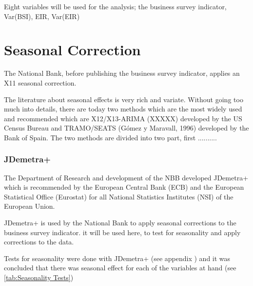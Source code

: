\documentclass[12pt,a4paper,oneside]{book}
\begin{document}
Eight variables will be used for the analysis; the business survey indicator, Var(BSI), EIR, Var(EIR)

\section{Seasonal Correction}
\label{sec:seasonal correction}

The National Bank, before publishing the business survey indicator, applies an X11 seasonal correction.

The literature about seasonal effects is very rich and variate. Without going too much into details, there are today two methods which are the most widely used and recommended which are X12/X13-ARIMA (XXXXX) developed by the US Census Bureau and TRAMO/SEATS (Gómez y Maravall, 1996) developed by the Bank of Spain. The two methods are divided into two part, first ..........



\subsubsection{JDemetra+}

The Department of Research and development of the NBB developed JDemetra+ which is recommended by the European Central Bank (ECB) and the European Statistical Office (Eurostat) for all National Statistics Institutes (NSI) of the European Union. 

JDemetra+ is used by the National Bank to apply seasonal corrections to the business survey indicator. it will be used here, to test for seasonality and apply corrections to the data.

Tests for seasonality were done with JDemetra+ (see appendix ) and it was concluded that there was seasonal effect for each of the variables at hand (see \autoref{tab:Seasonality Tests})
\end{document}
